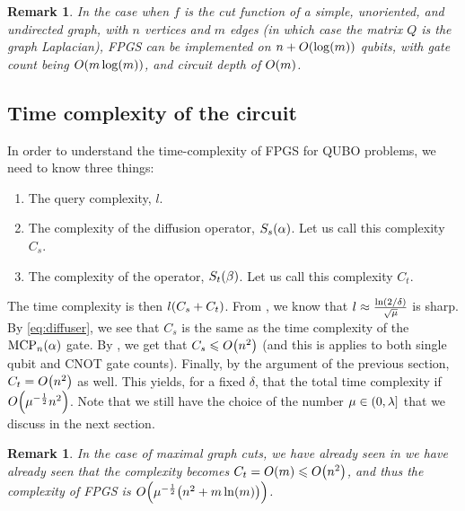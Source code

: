 \documentclass[reqno, 10pt]{amsart}
\numberwithin{equation}{section}                     %
\let\originalleft\left
\let\originalright\right
\renewcommand{\left}{\mathopen{}\mathclose\bgroup\originalleft}
\renewcommand{\right}{\aftergroup\egroup\originalright}
\def\({\mathopen{}\left(}
\def\){\right)\mathclose{}}
\newtheorem{remark}[theorem]{Remark}
\begin{document}
\smallskip

\begin{remark}
     \label{remark:graphcuts}
     In the case when $f$ is the cut function of a simple, unoriented, and undirected graph, with $n$ vertices and $m$ edges (in which case the matrix $Q$ is the graph Laplacian), FPGS can be implemented on $n + O \( \log (m) \)$ qubits, with gate count being $O \( m \log (m) \)$, and circuit depth of $O \( m \)$.
\end{remark}

\bigskip

\subsection{Time complexity of the circuit}
\label{sec:time}

In order to understand the time-complexity of FPGS for QUBO problems, we need to know three things:
\begin{enumerate}

     \item The query complexity, $l$.
     
     \item The complexity of the diffusion operator, $S_s \( \alpha \)$. Let us call this complexity $C_s$.
     
     \item The complexity of the operator, $S_t \( \beta \)$. Let us call this complexity $C_t$.

\end{enumerate}

The time complexity is then $l \( C_s + C_t \)$. From \cite{yoder_fixed_2014}, we know that $l \approx \tfrac{\ln \( 2 / \delta \)}{\sqrt{\mu}}$ is sharp. By \cref{eq:diffuser}, we see that $C_s$ is the same as the time complexity of the $\mathrm{MCP}_n \( \alpha \)$ gate. By \cite{dasilva_linear_2022}, we get that $C_s \leqslant O \( n^2 \)$ (and this is applies to both single qubit and CNOT gate counts). Finally, by the argument of the previous section, $C_t = O \( n^2 \)$ as well. This yields, for a fixed $\delta$, that the total time complexity if $O \( \mu^{- \frac{1}{2}} n^2 \)$. Note that we still have the choice of the number $\mu \in \( 0, \lambda \right]$ that we discuss in the next section.

\smallskip

\begin{remark}
     In the case of maximal graph cuts, we have already seen in  we have already seen that the complexity becomes $C_t = O \( m \) \leqslant O \( n^2 \)$, and thus the complexity of FPGS is $O \( \mu^{- \frac{1}{2}} \( n^2 + m \ln(m) \) \)$.
\end{remark}
\end{document}
